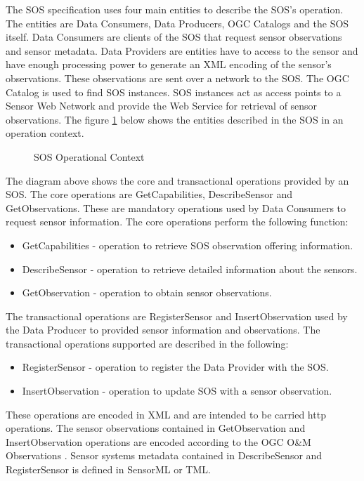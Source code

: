\documentclass[]{final_report}
\begin{document}
The SOS specification uses four main entities to describe the SOS's operation. The entities are Data Consumers, Data Producers, OGC Catalogs and the SOS itself. Data Consumers are clients of the SOS that request sensor observations and sensor metadata. Data Providers are entities have to access to the sensor and have enough processing power to generate an XML encoding of the sensor's observations. These observations are sent over a network to the SOS. The OGC Catalog is used to find SOS instances. SOS instances act as access points to a Sensor Web Network and provide the Web Service for retrieval of sensor observations. The figure \ref{fig:SOSoperationContext} below shows the entities described in the SOS in an operation context.
\begin{figure}[h]
\caption{SOS Operational Context}\label{fig:SOSoperationContext}
\end{figure}

The diagram above shows the core and transactional operations provided by an SOS. The core operations are GetCapabilities, DescribeSensor and GetObservations. These are mandatory operations used by Data Consumers to request sensor information.  The core operations perform the following function:
 \begin{itemize}
\item GetCapabilities  -   operation to retrieve SOS observation offering information.
\item DescribeSensor - operation to retrieve detailed information about the sensors.
\item GetObservation -   operation to obtain sensor observations.
\end{itemize}

The transactional operations are RegisterSensor and InsertObservation used by the Data Producer to provided sensor information and observations. The transactional operations supported are described in the following:
 \begin{itemize}
\item RegisterSensor - operation to register the Data Provider with the SOS.
\item InsertObservation - operation to update SOS with a sensor observation.
\end{itemize}

These operations are encoded in XML and are intended to be carried http  operations. The sensor observations contained in  GetObservation and InsertObservation operations are encoded according to the OGC O\&M Observations \cite{OMref}. Sensor systems metadata contained in DescribeSensor and RegisterSensor is defined in SensorML or TML.
\end{document}
